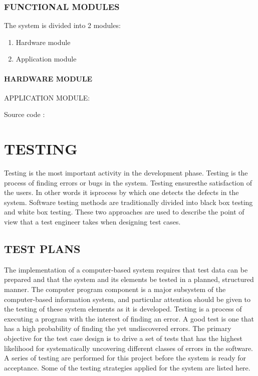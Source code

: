 \documentclass[11pt]{report} %
\begin{document}
\subsection{FUNCTIONAL MODULES}
\label{subsec:FUNCTIONAL MODULES}

The system is divided into 2 modules:

\begin{enumerate}
	\item Hardware module
	\item Application module
\end{enumerate}

\subsubsection{HARDWARE MODULE}
\label{subsubsec:HARDWARE MODULE}

APPLICATION MODULE:

Source code :

\chapter{TESTING}
\label{cha:TESTING}

Testing is the most important activity in the development phase. Testing is the process of    finding   errors or bugs in the system. Testing ensuresthe satisfaction of the users. In other words it isprocess by which one detects the defects in the system. Software testing methods are  traditionally divided into black box testing and white box testing. These two approaches are used to describe the point of view that a test engineer takes when designing test cases.

\section{TEST PLANS}
\label{sec:TEST PLANS}

The implementation of a computer-based system requires that test data can be prepared and that the system and its elements be tested in a planned, structured manner. The computer program component is a major subsystem of the computer-based information system, and particular attention should be given to the testing of these system elements as it is developed.
Testing is a process of executing a program with the interest of finding an error. A good test is one that has a high probability of finding the yet undiscovered errors. The primary objective for the test case design is to drive a set of tests that has the highest likelihood for systematically uncovering different classes of errors in the software. A series of testing are performed for this project before the system is ready for acceptance.  Some of the testing strategies applied for the system are listed here.
\end{document}
